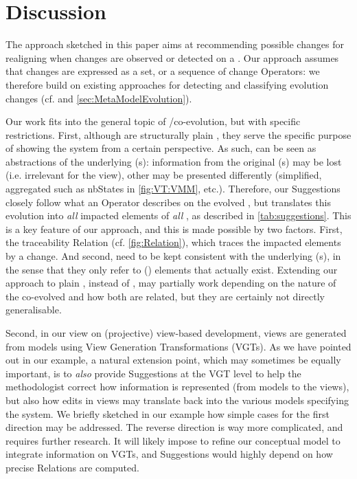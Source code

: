 \section{Discussion}
\label{sec:Discussion}

The approach sketched in this paper aims at recommending possible changes 
for realigning \viewtypes when changes are observed or detected on a 
\metamodel. Our approach assumes that \metamodel changes are expressed
as a set, or a sequence of change \textsf{Operator}s: we therefore build
on existing approaches for detecting and classifying evolution changes
(cf. \cite{herrmannsdoerfer_extensive_2011,khelladi_detecting_2015} and  \cref{sec:MetaModelEvolution}).

Our work fits into the general topic of \metamodel/\metamodel co-evolution,
but with specific restrictions. First, although \viewtypes are structurally 
plain \metamodels, they serve the specific purpose of showing the system from a 
certain perspective.
As such, \viewtypes can be seen as abstractions of the underlying \metamodel{}(s):
information from the original \metamodel{}(s) may be lost (i.e. irrelevant for 
the view), other may be presented differently (simplified, aggregated such as 
\textsf{nbStates} in \cref{fig:VT:VMM}, etc.). Therefore, our
\textsf{Suggestion}s closely follow what an \textsf{Operator} describes on
the evolved \metamodel, but translates this evolution into \emph{all} impacted
elements of \emph{all} \viewtypes, as described in \cref{tab:suggestions}.
This is a key feature of our approach, and this is made possible by two factors.
First, the traceability \textsf{Relation} (cf. \cref{fig:Relation}), which traces
the impacted \viewtype elements by a change. And second, \viewtypes need to be kept
consistent with the underlying \metamodel(s), in the sense that they only refer
to (\metamodel) elements that actually exist. 
Extending our approach to plain \metamodels, instead of \viewtypes, may partially
work depending on the nature of the co-evolved \metamodels and how
both \metamodels are related, but they are certainly not directly generalisable.

Second, in our view on (projective) view-based development, views are generated
from models using View Generation Transformations (VGTs). As we have pointed out in our
example, a natural extension point, which may sometimes be equally important,
is to \emph{also} provide \textsf{Suggestion}s at the VGT level to help the
methodologist correct how information is represented (from models to the views),
but also how edits in views may translate back into the various models specifying
the system. We briefly sketched in our example how simple cases for the first 
direction may be addressed. The reverse direction is way more complicated, and 
requires further research. 
It will likely impose to refine our conceptual model to integrate information
on VGTs, and \textsf{Suggestion}s would highly depend on how precise 
\textsf{Relation}s are computed. 

